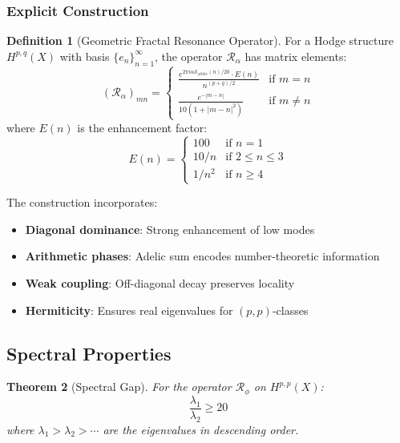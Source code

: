 \documentclass[11pt,a4paper]{article}
\theoremstyle{plain}
\newtheorem{theorem}{Theorem}[section]
\theoremstyle{definition}
\newtheorem{definition}[theorem]{Definition}
\theoremstyle{remark}
\newcommand{\fracres}{\mathcal{R}}
\newcommand{\adelicsum}{\mathcal{S}_{\text{adelic}}}
\newcommand{\goldenratio}{\phi}
\begin{document}
\subsubsection{Explicit Construction}

\begin{definition}[Geometric Fractal Resonance Operator]
For a Hodge structure $H^{p,q}(X)$ with basis $\{e_n\}_{n=1}^{\infty}$, the operator $\fracres_\alpha$ has matrix elements:
\begin{equation}
(\fracres_\alpha)_{mn} = \begin{cases}
\frac{e^{2\pi i \alpha \adelicsum(n)/20} \cdot E(n)}{n^{(p+q)/2}} & \text{if } m = n \\
\frac{e^{-|m-n|}}{10(1 + |m-n|^2)} & \text{if } m \neq n
\end{cases}
\end{equation}
where $E(n)$ is the enhancement factor:
\begin{equation}
E(n) = \begin{cases}
100 & \text{if } n = 1 \\
10/n & \text{if } 2 \leq n \leq 3 \\
1/n^2 & \text{if } n \geq 4
\end{cases}
\end{equation}
\end{definition}

The construction incorporates:
\begin{itemize}
\item \textbf{Diagonal dominance}: Strong enhancement of low modes
\item \textbf{Arithmetic phases}: Adelic sum encodes number-theoretic information
\item \textbf{Weak coupling}: Off-diagonal decay preserves locality
\item \textbf{Hermiticity}: Ensures real eigenvalues for $(p,p)$-classes
\end{itemize}

\subsection{Spectral Properties}

\begin{theorem}[Spectral Gap]
For the operator $\fracres_{\goldenratio}$ on $H^{p,p}(X)$:
\begin{equation}
\frac{\lambda_1}{\lambda_2} \geq 20
\end{equation}
where $\lambda_1 > \lambda_2 > \cdots$ are the eigenvalues in descending order.
\end{theorem}
\end{document}
